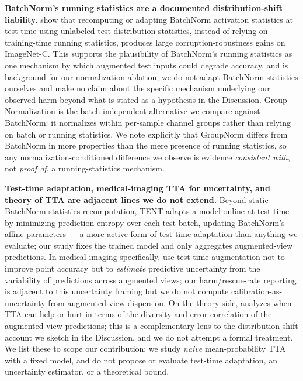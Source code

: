 \textbf{BatchNorm's running statistics are a documented distribution-shift liability.} \citet{schneider2020improving} show that recomputing or adapting BatchNorm activation statistics at test time using unlabeled test-distribution statistics, instead of relying on training-time running statistics, produces large corruption-robustness gains on ImageNet-C. This supports the plausibility of BatchNorm's running statistics as one mechanism by which augmented test inputs could degrade accuracy, and is background for our normalization ablation; we do not adapt BatchNorm statistics ourselves and make no claim about the specific mechanism underlying our observed harm beyond what is stated as a hypothesis in the Discussion. Group Normalization \citep{wu2018group} is the batch-independent alternative we compare against BatchNorm: it normalizes within per-sample channel groups rather than relying on batch or running statistics. We note explicitly that GroupNorm differs from BatchNorm in more properties than the mere presence of running statistics, so any normalization-conditioned difference we observe is evidence \emph{consistent with}, not \emph{proof of}, a running-statistics mechanism.

\textbf{Test-time adaptation, medical-imaging TTA for uncertainty, and theory of TTA are adjacent lines we do not extend.} Beyond static BatchNorm-statistics recomputation, TENT \citep{wang2021tent} adapts a model online at test time by minimizing prediction entropy over each test batch, updating BatchNorm's affine parameters --- a more active form of test-time adaptation than anything we evaluate; our study fixes the trained model and only aggregates augmented-view predictions. In medical imaging specifically, \citet{ayhan2018ttaug} use test-time augmentation not to improve point accuracy but to \emph{estimate} predictive uncertainty from the variability of predictions across augmented views; our harm/rescue-rate reporting is adjacent to this uncertainty framing but we do not compute calibration-as-uncertainty from augmented-view dispersion. On the theory side, \citet{kimura2024understanding} analyzes when TTA can help or hurt in terms of the diversity and error-correlation of the augmented-view predictions; this is a complementary lens to the distribution-shift account we sketch in the Discussion, and we do not attempt a formal treatment. We list these to scope our contribution: we study \emph{naive} mean-probability TTA with a fixed model, and do not propose or evaluate test-time adaptation, an uncertainty estimator, or a theoretical bound.

